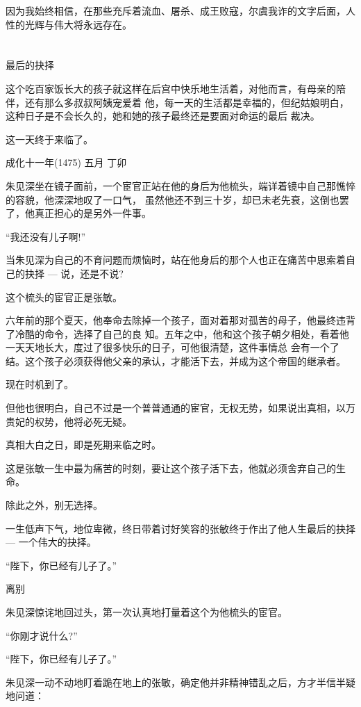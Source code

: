 \documentclass[11pt,a4paper,onecolumn]{article}
\begin{document}
因为我始终相信，在那些充斥着流血、屠杀、成王败寇，尔虞我诈的文字后面，人性的光辉与伟大将永远存在。

\section[\thesection]{}

最后的抉择

这个吃百家饭长大的孩子就这样在后宫中快乐地生活着，对他而言，有母亲的陪伴，还有那么多叔叔阿姨宠爱着
他，每一天的生活都是幸福的，但纪姑娘明白，这种日子是不会长久的，她和她的孩子最终还是要面对命运的最后
裁决。

这一天终于来临了。

成化十一年(1475) 五月 丁卯

朱见深坐在镜子面前，一个宦官正站在他的身后为他梳头，端详着镜中自己那憔悴的容貌，他深深地叹了一口气，
虽然他还不到三十岁，却已未老先衰，这倒也罢了，他真正担心的是另外一件事。

``我还没有儿子啊!''

当朱见深为自己的不育问题而烦恼时，站在他身后的那个人也正在痛苦中思索着自己的抉择 --- 说，还是不说?

这个梳头的宦官正是张敏。

六年前的那个夏天，他奉命去除掉一个孩子，面对着那对孤苦的母子，他最终违背了冷酷的命令，选择了自己的良
知。五年之中，他和这个孩子朝夕相处，看着他一天天地长大，度过了很多快乐的日子，可他很清楚，这件事情总
会有一个了结。这个孩子必须获得他父亲的承认，才能活下去，并成为这个帝国的继承者。

现在时机到了。

但他也很明白，自己不过是一个普普通通的宦官，无权无势，如果说出真相，以万贵妃的权势，他将必死无疑。

真相大白之日，即是死期来临之时。

这是张敏一生中最为痛苦的时刻，要让这个孩子活下去，他就必须舍弃自己的生命。

除此之外，别无选择。

一生低声下气，地位卑微，终日带着讨好笑容的张敏终于作出了他人生最后的抉择 --- 一个伟大的抉择。

``陛下，你已经有儿子了。''

离别

朱见深惊诧地回过头，第一次认真地打量着这个为他梳头的宦官。

``你刚才说什么?''

``陛下，你已经有儿子了。''

朱见深一动不动地盯着跪在地上的张敏，确定他并非精神错乱之后，方才半信半疑地问道：
\end{document}
